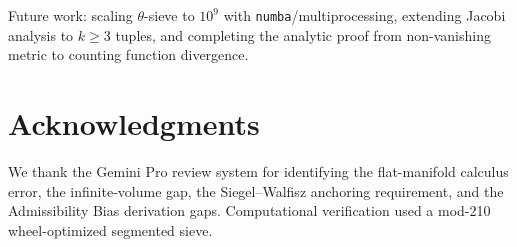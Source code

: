 \documentclass[12pt]{article}
\begin{document}
Future work: scaling $\theta$-sieve to $10^9$ with \texttt{numba}/multiprocessing,
extending Jacobi analysis to $k \geq 3$ tuples, and completing the analytic
proof from non-vanishing metric to counting function divergence.

\section*{Acknowledgments}

We thank the Gemini Pro review system for identifying the flat-manifold calculus
error, the infinite-volume gap, the Siegel--Walfisz anchoring requirement, and
the Admissibility Bias derivation gaps. Computational verification used a
mod-210 wheel-optimized segmented sieve.
\end{document}
